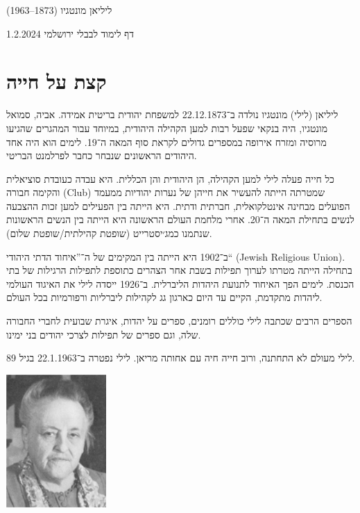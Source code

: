 \documentclass[14pt, article, extrafontsizes, twopage, a4paper]{memoir}
\begin{document}
{
  \centering
  \LARGE ליליאן מונטגיו (1873–1963)

  \Large דף לימוד לבבלי ירושלמי 1.2.2024

}

\chapter{קצת על חייה}
  {\larger


ליליאן (לילי) מונטגיו נולדה ב־22.12.1873 למשפחת יהודית בריטית אמידה. אביה, סמואל מונטגיו, היה בנקאי שפעל רבות למען הקהילה היהודית, במיוחד עבור המהגרים שהגיעו מרוסיה ומזרח אירופה במספרים גדולים לקראת סוף המאה ה־19. לימים הוא היה אחד היהודים הראשונים שנבחר כחבר לפרלמנט הבריטי.

כל חייה פעלה לילי למען הקהילה, הן היהודית והן הכללית. היא עבדה כעובדת סוציאלית והקימה חבורה (\textenglish{Club}) שמטרתה הייתה להעשיר את חייהן של נערות יהודיות ממעמד הפועלים מבחינה אינטלקואלית, חברתית ודתית. היא הייתה בין הפעילים למען זכות ההצבעה לנשים בתחילת המאה ה־20. אחרי מלחמת העולם הראשונה היא הייתה בין הנשים הראשונות שנתמנו כמג׳יסטרייט (שופטת קהילתית/שופטת שלום).

ב־1902 היא הייתה בין המקימים של ה־”איחוד הדתי היהודי“ (\textenglish{Jewish Religious Union}). בתחילה הייתה מטרתו לערוך תפילות בשבת אחר הצהרים כתוספת לתפילות הרגילות של בתי הכנסת. לימים הפך האיחוד לתנועת היהדות הליברלית. ב־1926 ייסדה לילי את האיגוד העולמי ליהדות מתקדמת, הקיים עד היום כארגון גג לקהילות ליברליות ורפורמיות בכל העולם.

הספרים הרבים שכתבה לילי כוללים רומנים, ספרים על יהדות, איגרת שבועית לחברי החבורה שלה, וגם ספרים של תפילות לצרכי יהודים בני ימינו.

לילי מעולם לא התחתנה, ורוב חייה חיה עם אחותה מריאן. לילי נפטרה ב־22.1.1963 בגיל 89.

{
  \centering
\includegraphics[width=3.8cm]{lilyolder.png}\\

}
  }
  
\clearpage
\end{document}
